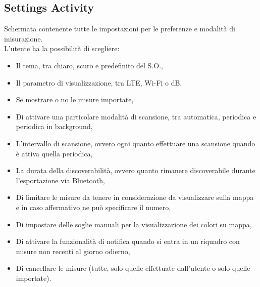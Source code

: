 \documentclass[11pt]{article}
\begin{document}
\subsection{Settings Activity}
\label{sec:settingsActivity}
Schermata contenente tutte le impostazioni per le preferenze e modalità di misurazione. \\
L'utente ha la possibilità di scegliere:
\begin{itemize}
    \item Il tema, tra chiaro, scuro e predefinito del S.O.,
    \item Il parametro di visualizzazione, tra LTE, Wi-Fi o dB,
    \item Se mostrare o no le misure importate,
    \item Di attivare una particolare modalità di scansione, tra automatica, periodica e periodica in background,
    \item L'intervallo di scansione, ovvero ogni quanto effettuare una scansione quando è attiva quella periodica,
    \item La durata della discoverabilità, ovvero quanto rimanere discoverabile durante l'esportazione via Bluetooth,
    \item Di limitare le misure da tenere in considerazione da visualizzare sulla mappa e in caso affermativo ne può specificare il numero,
    \item Di impostare delle soglie manuali per la visualizzazione dei colori su mappa,
    \item Di attivare la funzionalità di notifica quando si entra in un riquadro con misure non recenti al giorno odierno,
    \item Di cancellare le misure (tutte, solo quelle effettuate dall'utente o solo quelle importate).
\end{itemize}
\end{document}
